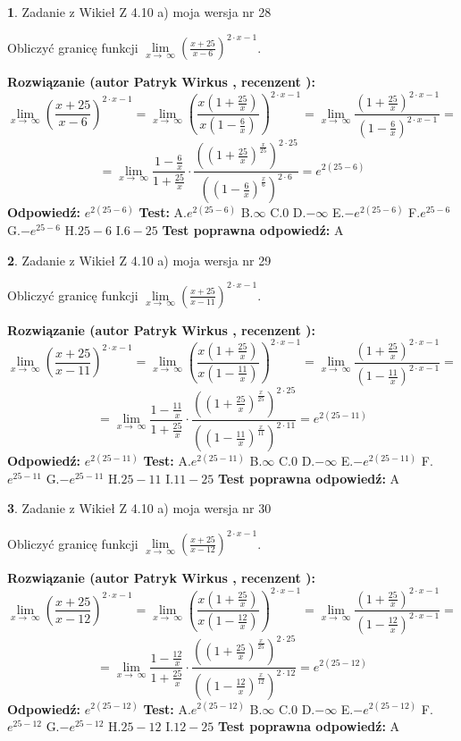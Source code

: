 \documentclass[12pt, a4paper]{article}
\theoremstyle{definition} %
\newtheorem{zad}{}
\newcommand{\zadStart}[1]{\begin{zad}#1\newline}
\newcommand{\zadStop}{\end{zad}}
\newcommand{\rozwStart}[2]{\noindent \textbf{Rozwiązanie (autor #1 , recenzent #2): }\newline}
\newcommand{\rozwStop}{\newline}
\newcommand{\odpStart}{\noindent \textbf{Odpowiedź:}\newline}
\newcommand{\odpStop}{\newline}
\newcommand{\testStart}{\noindent \textbf{Test:}\newline}
\newcommand{\testStop}{\newline}
\newcommand{\kluczStart}{\noindent \textbf{Test poprawna odpowiedź:}\newline}
\newcommand{\kluczStop}{\newline}
\begin{document}
\zadStart{Zadanie z Wikieł Z 4.10 a) moja wersja nr 28}


Obliczyć granicę funkcji  $\lim\limits_{x\to\ \infty}(\frac{x+25}{x-6})^{2\cdot x-1}$.
\zadStop
\rozwStart{Patryk Wirkus}{}
$$\lim\limits_{x\to\ \infty}(\frac{x+25}{x-6})^{2\cdot x-1} = \lim\limits_{x\to\ \infty}(\frac{x(1+\frac{25}{x})}{x(1-\frac{6}{x})})^{2\cdot x-1}=\lim\limits_{x\to\ \infty}\frac{(1+\frac{25}{x})^{2\cdot x-1}}{(1-\frac{6}{x})^{2\cdot x-1}}=$$
$$=\lim\limits_{x\to\ \infty}\frac{1-\frac{6}{x}}{1+\frac{25}{x}}\cdot\frac{((1+\frac{25}{x})^{\frac{x}{25}})^{2\cdot25}}{((1-\frac{6}{x})^{\frac{x}{6}})^{2\cdot6}}=e^{2(25-6)}$$
\rozwStop
\odpStart
$e^{2(25-6)}$
\odpStop
\testStart
A.$e^{2(25-6)}$ B.$\infty$ C.$0$ D.$-\infty$ E.$-e^{2(25-6)}$
F.$e^{25-6}$ G.$-e^{25-6}$
H.$25-6$
I.$6-25$
\testStop
\kluczStart
A
\kluczStop



\zadStart{Zadanie z Wikieł Z 4.10 a) moja wersja nr 29}


Obliczyć granicę funkcji  $\lim\limits_{x\to\ \infty}(\frac{x+25}{x-11})^{2\cdot x-1}$.
\zadStop
\rozwStart{Patryk Wirkus}{}
$$\lim\limits_{x\to\ \infty}(\frac{x+25}{x-11})^{2\cdot x-1} = \lim\limits_{x\to\ \infty}(\frac{x(1+\frac{25}{x})}{x(1-\frac{11}{x})})^{2\cdot x-1}=\lim\limits_{x\to\ \infty}\frac{(1+\frac{25}{x})^{2\cdot x-1}}{(1-\frac{11}{x})^{2\cdot x-1}}=$$
$$=\lim\limits_{x\to\ \infty}\frac{1-\frac{11}{x}}{1+\frac{25}{x}}\cdot\frac{((1+\frac{25}{x})^{\frac{x}{25}})^{2\cdot25}}{((1-\frac{11}{x})^{\frac{x}{11}})^{2\cdot11}}=e^{2(25-11)}$$
\rozwStop
\odpStart
$e^{2(25-11)}$
\odpStop
\testStart
A.$e^{2(25-11)}$ B.$\infty$ C.$0$ D.$-\infty$ E.$-e^{2(25-11)}$
F.$e^{25-11}$ G.$-e^{25-11}$
H.$25-11$
I.$11-25$
\testStop
\kluczStart
A
\kluczStop



\zadStart{Zadanie z Wikieł Z 4.10 a) moja wersja nr 30}


Obliczyć granicę funkcji  $\lim\limits_{x\to\ \infty}(\frac{x+25}{x-12})^{2\cdot x-1}$.
\zadStop
\rozwStart{Patryk Wirkus}{}
$$\lim\limits_{x\to\ \infty}(\frac{x+25}{x-12})^{2\cdot x-1} = \lim\limits_{x\to\ \infty}(\frac{x(1+\frac{25}{x})}{x(1-\frac{12}{x})})^{2\cdot x-1}=\lim\limits_{x\to\ \infty}\frac{(1+\frac{25}{x})^{2\cdot x-1}}{(1-\frac{12}{x})^{2\cdot x-1}}=$$
$$=\lim\limits_{x\to\ \infty}\frac{1-\frac{12}{x}}{1+\frac{25}{x}}\cdot\frac{((1+\frac{25}{x})^{\frac{x}{25}})^{2\cdot25}}{((1-\frac{12}{x})^{\frac{x}{12}})^{2\cdot12}}=e^{2(25-12)}$$
\rozwStop
\odpStart
$e^{2(25-12)}$
\odpStop
\testStart
A.$e^{2(25-12)}$ B.$\infty$ C.$0$ D.$-\infty$ E.$-e^{2(25-12)}$
F.$e^{25-12}$ G.$-e^{25-12}$
H.$25-12$
I.$12-25$
\testStop
\kluczStart
A
\kluczStop
\end{document}
